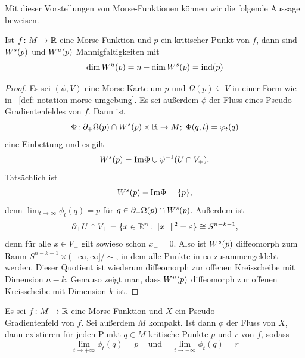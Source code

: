 Mit dieser Vorstellungen von Morse-Funktionen können wir die folgende Aussage beweisen.

\begin{prop}
    Ist $f \colon M \to { \mathbb R }$ eine Morse Funktion und $p$ ein kritischer Punkt von $f$, dann sind
    ${ W^s } (p)$ und ${ W^u } (p)$ Mannigfaltigkeiten mit 
    \[ \dim { W^u } (p) = n - \dim { W^s } (p) = { \operatorname{ind} } (p) \]
\end{prop}

\begin{proof}
    Es sei $(\psi, V)$ eine Morse-Karte um $p$ und $\Omega(p) \subseteq V$ in einer Form wie 
    in ~\ref{def: notation morse umgebung}. Es sei außerdem $\phi$ der Fluss eines 
    Pseudo-Gradientenfeldes von $f$. Dann ist 
    \[ \Phi \colon { \partial }_+ \Omega (p) \cap { W^s } (p) \times { \mathbb R } \to M ; \; \Phi (q, t) = \varphi_t(q) \]
    eine Einbettung und es gilt 
    \[ { W^s } (p) = { \operatorname{Im} } \Phi \cup \psi^{-1}(U \cap V_+) . \]
    Tatsächlich ist 
    \[ { W^s } (p) - { \operatorname{Im} } \Phi = \{ p \} , \]
    denn $\lim_{t \to \infty} \phi_t(q) = p$ für $q \in { \partial }_+ \Omega (p) \cap { W^s } (p)$. 
    Außerdem ist 
    \[ { \partial }_+ U \cap V_+ = \{ x \in { \mathbb R }^n: \| x_+ \|^2 = \varepsilon \} \cong S^{n - k - 1} , \] 
    denn für alle $x \in V_+$ gilt sowieso schon $x_- = 0$. Also ist ${ W^s }(p)$ diffeomorph zum Raum 
    $S^{n - k - 1} \times (-\infty, \infty]/\sim$, in dem alle Punkte in $\infty$ zusammengeklebt 
    werden. Dieser Quotient ist wiederum diffeomorph zur offenen Kreisscheibe mit Dimension $n - k$.
    Genauso zeigt man, dass ${ W^u } (p)$ diffeomorph zur offenen Kreisscheibe mit Dimension $k$ ist.
\end{proof}

\begin{prop}
    \label{prop: trajektorien enden in kritischen punkten}
    Es sei $f \colon M \to { \mathbb R }$ eine Morse-Funktion und $X$ ein Pseudo-\\Gradientenfeld von $f$. 
    Sei außerdem $M$ kompakt. Ist dann $\phi$ der Fluss von $X$, dann existieren für jeden Punkt 
    $q \in M$ kritische Punkte $p$ und $r$ von $f$, sodass
    \[ \lim_{t \to + \infty} \phi_t(q) = p \;\;\; 
    \text{ und } \;\;\; \lim_{t \to -\infty} \phi_t(q) = r \]
\end{prop}

